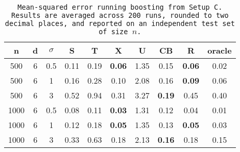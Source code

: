 \begin{table}[ht]
\centering
\begin{tabular}{cccccccccc}
  \hline
n & d & $\sigma$ & S & T & X & U & CB & R & oracle \\ 
  \hline
500 & 6 & 0.5 & 0.11 & 0.19 & \bf 0.06 & 1.35 & 0.15 & \bf 0.06 & 0.02 \\ 
  500 & 6 & 1 & 0.16 & 0.28 & 0.10 & 2.08 & 0.16 & \bf 0.09 & 0.06 \\ 
  500 & 6 & 3 & 0.52 & 0.94 & 0.31 & 3.27 & \bf 0.19 & 0.45 & 0.40 \\ 
  1000 & 6 & 0.5 & 0.08 & 0.11 & \bf 0.03 & 1.31 & 0.12 & 0.04 & 0.01 \\ 
  1000 & 6 & 1 & 0.12 & 0.18 & \bf 0.05 & 1.35 & 0.13 & \bf 0.05 & 0.03 \\ 
  1000 & 6 & 3 & 0.33 & 0.63 & 0.18 & 2.13 & \bf 0.16 & 0.18 & 0.15 \\ 
   \hline
\end{tabular}
\caption{\tt Mean-squared error running \texttt{boosting} from Setup C. Results are averaged across 200 runs, rounded to two decimal places, and reported on an independent test set of size $n$.} 
\label{table:setup3}
\end{table}
